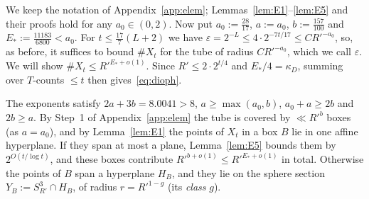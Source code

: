 \documentclass[aps,prx,twocolumn,superscriptaddress,nofootinbib,longbibliography]{revtex4-2}
\theoremstyle{plain}
\theoremstyle{definition}
\theoremstyle{remark}
\begin{document}
We keep the notation of Appendix~\ref{app:elem}; Lemmas~\ref{lem:E1}--\ref{lem:E5} and their proofs hold for any $a_0\in(0,2)$. Now put $a_0:=\tfrac{28}{17}$, $a:=a_0$, $b:=\tfrac{157}{100}$ and $E_*:=\tfrac{11183}{6800}<a_0$. For $t\le\tfrac{17}7(L+2)$ we have $\varepsilon=2^{-L}\le4\cdot2^{-7t/17}\le CR'^{-a_0}$, so, as before, it suffices to bound $\#X_t$ for the tube of radius $CR'^{-a_0}$, which we call $\varepsilon$. We will show $\#X_t\le R'^{E_*+o(1)}$. Since $R'\le2\cdot2^{t/4}$ and $E_*/4=\kappa_D$, summing over $T$-counts $\le t$ then gives~\eqref{eq:dioph}.

The exponents satisfy $2a+3b=8.0041>8$, $a\ge\max(a_0,b)$, $a_0+a\ge2b$ and $2b\ge a$. By Step~1 of Appendix~\ref{app:elem} the tube is covered by $\ll R'^{b}$ boxes (as $a=a_0$), and by Lemma~\ref{lem:E1} the points of $X_t$ in a box $B$ lie in one affine hyperplane. If they span at most a plane, Lemma~\ref{lem:E5} bounds them by $2^{O(t/\log t)}$, and these boxes contribute $R'^{b+o(1)}\le R'^{E_*+o(1)}$ in total. Otherwise the points of $B$ span a hyperplane $H_B$, and they lie on the sphere section $Y_B:=S^3_{R'}\cap H_B$, of radius $r=R'^{1-g}$ (its \emph{class} $g$).
\end{document}
